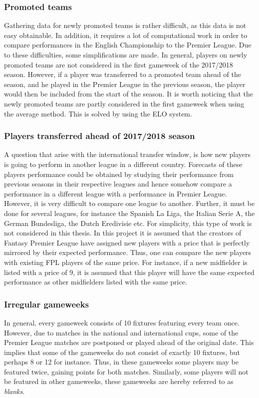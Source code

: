 \subsubsection{Promoted teams}
Gathering data for newly promoted teams is rather difficult, as this data is not easy obtainable. In addition, it requires a lot of computational work in order to compare performances in the English Championship to the Premier League. Due to these difficulties, some simplifications are made. In general, players on newly promoted teams are not considered in the first gameweek of the 2017/2018 season. However, if a player was transferred to a promoted team ahead of the season, and he played in the Premier League in the previous season, the player would then be included from the start of the season. It is worth noticing that the newly promoted teams are partly considered in the first gameweek when using the average method. This is solved by using the ELO system. 
\subsubsection{Players transferred ahead of 2017/2018 season}
A question that arise with the international transfer window, is how new players is going to perform in another league in a different country. Forecasts of these players performance could be obtained by studying their performance from previous seasons in their respective leagues and hence somehow compare a performance in a different league with a performance in Premier League. However, it is very difficult to compare one league to another. Further, it must be done for several leagues, for instance the Spanish La Liga, the Italian Serie A, the German Bundesliga, the Dutch Eredivisie etc. For simplicity, this type of work is not considered in this thesis.
\newpar
In this project it is assumed that the creators of Fantasy Premier League have assigned new players with a price that is perfectly mirrored by their expected performance. Thus, one can compare the new players with existing FPL players of the same price. For instance, if a new midfielder is listed with a price of 9, it is assumed that this player will have the same expected performance as other midfielders listed with the same price.
\subsubsection{Irregular gameweeks}
In general, every gameweek consists of 10 fixtures featuring every team once. However, due to matches in the national and international cups, some of the Premier League matches are postponed or played ahead of the original date. This implies that some of the gameweeks do not consist of exactly 10 fixtures, but perhaps 8 or 12 for instance. Thus, in these gameweeks some players may be featured twice, gaining points for both matches. Similarly, some players will not be featured in other gameweeks, these gameweeks are hereby referred to as \textit{blanks}.

